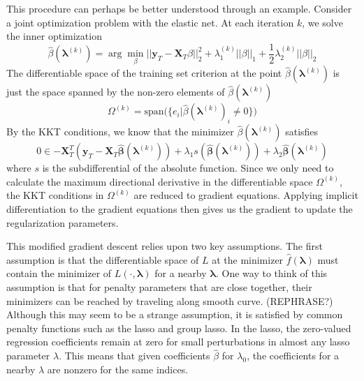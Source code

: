 \documentclass[10pt,letterpaper]{article}
\begin{document}
This procedure can perhaps be better understood through an example. Consider a joint optimization problem with the elastic net. At each iteration $k$, we solve the inner optimization
\begin{equation}
\hat \beta(\boldsymbol{\lambda}^{(k)}) = \arg \min_{\beta} ||\boldsymbol{y}_T - \boldsymbol{X}_T \beta||^2_2 + \lambda_1^{(k)} ||\beta||_1 + \frac{1}{2} \lambda_2^{(k)} ||\beta||_2
\end{equation}
The differentiable space of the training set criterion at the point $\hat \beta(\boldsymbol{\lambda}^{(k)})$ is just the space spanned by the non-zero elements of $\hat \beta(\boldsymbol{\lambda}^{(k)})$
\begin{equation}
\Omega^{(k)} = \text{span} \Big ( \{ e_i | \hat \beta(\boldsymbol{\lambda}^{(k)})_i \ne 0 \} \Big )
\end{equation}
By the KKT conditions, we know that the minimizer $\hat \beta(\boldsymbol{\lambda}^{(k)})$ satisfies
\begin{equation}
0 \in -\boldsymbol{X}_T^T(\boldsymbol{y}_T
- \boldsymbol{X}_T \hat{\boldsymbol{\beta}} (\boldsymbol{\lambda}^{(k)}) )
+ \lambda_1 s(\hat{\boldsymbol{\beta}} (\boldsymbol{\lambda}^{(k)}))
+ \lambda_2 \hat{\boldsymbol{\beta}} (\boldsymbol{\lambda}^{(k)})
\end{equation}
where $s$ is the subdifferential of the absolute function. Since we only need to calculate the maximum directional derivative in the differentiable space $\Omega^{(k)}$, the KKT conditions in $\Omega^{(k)}$ are reduced to gradient equations. Applying implicit differentiation to the gradient equations then gives us the gradient to update the regularization parameters.

This modified gradient descent relies upon two key assumptions. The first assumption is that the differentiable space of $L$ at the minimizer $\hat f(\boldsymbol{\lambda})$ must contain the minimizer of $L(\cdot, \boldsymbol{\lambda})$ for a nearby $\boldsymbol{\lambda}$. One way to think of this assumption is that for penalty parameters that are close together, their minimizers can be reached by traveling along smooth curve. (REPHRASE?) Although this may seem to be a strange assumption, it is satisfied by common penalty functions such as the lasso and group lasso. In the lasso, the zero-valued regression coefficients remain at zero for small perturbations in almost any lasso parameter $\lambda$. This means that given coefficients $\hat \beta$ for $\lambda_0$, the coefficients for a nearby $\lambda$ are nonzero for the same indices.
\end{document}
